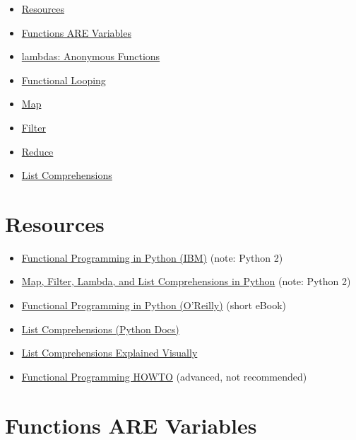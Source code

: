 \documentclass[]{book}
\providecommand{\tightlist}{%
  \setlength{\itemsep}{0pt}\setlength{\parskip}{0pt}}
\begin{document}
\begin{itemize}
\tightlist
\item
  \protect\hyperlink{resources}{Resources}
\item
  \protect\hyperlink{functions-are-variables}{Functions ARE Variables}
\item
  \protect\hyperlink{lambdas-anonymous-functions}{lambdas: Anonymous
  Functions}
\item
  \protect\hyperlink{functional-looping}{Functional Looping}
\item
  \protect\hyperlink{map}{Map}
\item
  \protect\hyperlink{filter}{Filter}
\item
  \protect\hyperlink{reduce}{Reduce}
\item
  \protect\hyperlink{list-comprehensions}{List Comprehensions}
\end{itemize}

\section{Resources}\label{resources-5}

\begin{itemize}
\tightlist
\item
  \href{https://www.ibm.com/developerworks/library/l-prog/}{Functional
  Programming in Python (IBM)} (note: Python 2)
\item
  \href{http://www.u.arizona.edu/~erdmann/mse350/topics/list_comprehensions.html}{Map,
  Filter, Lambda, and List Comprehensions in Python} (note: Python 2)
\item
  \href{http://www.oreilly.com/programming/free/files/functional-programming-python.pdf}{Functional
  Programming in Python (O'Reilly)} (short eBook)
\item
  \href{https://docs.python.org/3/tutorial/datastructures.html\#list-comprehensions}{List
  Comprehensions (Python Docs)}
\item
  \href{http://treyhunner.com/2015/12/python-list-comprehensions-now-in-color/}{List
  Comprehensions Explained Visually}
\item
  \href{https://docs.python.org/3/howto/functional.html}{Functional
  Programming HOWTO} (advanced, not recommended)
\end{itemize}

\hypertarget{functions-are-variables}{\section{Functions ARE
Variables}\label{functions-are-variables}}
\end{document}
